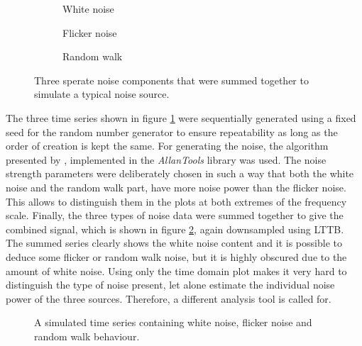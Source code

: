\begin{figure}[ht]
    \centering
    \begin{subfigure}{0.32\linewidth}
        \centering
        \scalebox{0.75}{%
            
        } %
        \caption{White noise}
    \end{subfigure}
    \begin{subfigure}{0.32\linewidth}
        \centering
        \scalebox{0.75}{%
            
        } %
        \caption{Flicker noise}
    \end{subfigure}
    \begin{subfigure}{0.32\linewidth}
        \centering
        \scalebox{0.75}{%
            
        } %
        \caption{Random walk}
    \end{subfigure}
    \caption{Three sperate noise components that were summed together to simulate a typical noise source.}
    \label{fig:adev_example_noise_types}
\end{figure}

The three time series shown in figure \ref{fig:adev_example_noise_types} were sequentially generated using a fixed seed for the random number generator to ensure repeatability as long as the order of creation is kept the same. For generating the noise, the algorithm presented by \citeauthor{noise_generation} \cite{noise_generation}, implemented in the \textit{AllanTools} library was used. The noise strength parameters were deliberately chosen in such a way that both the white noise and the random walk part, have more noise power than the flicker noise. This allows to distinguish them in the plots at both extremes of the frequency scale. Finally, the three types of noise data were summed together to give the combined signal, which is shown in figure \ref{fig:adev_example_time}, again downsampled using LTTB. The summed series clearly shows the white noise content and it is possible to deduce some flicker or random walk noise, but it is highly obscured due to the amount of white noise. Using only the time domain plot makes it very hard to distinguish the type of noise present, let alone estimate the individual noise power of the three sources. Therefore, a different analysis tool is called for.

\begin{figure}[ht]
    \centering
    
    \caption{A simulated time series containing white noise, flicker noise and random walk behaviour.}
    \label{fig:adev_example_time}
\end{figure}

